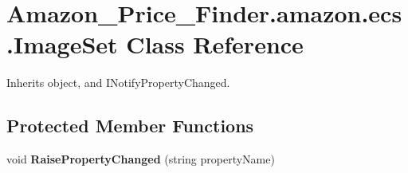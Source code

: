 \hypertarget{class_amazon___price___finder_1_1amazon_1_1ecs_1_1_image_set}{\section{Amazon\-\_\-\-Price\-\_\-\-Finder.\-amazon.\-ecs.\-Image\-Set Class Reference}
\label{class_amazon___price___finder_1_1amazon_1_1ecs_1_1_image_set}
}


 




Inherits object, and I\-Notify\-Property\-Changed.

\subsection*{Protected Member Functions}
\begin{DoxyCompactItemize}
\item 
\hypertarget{class_amazon___price___finder_1_1amazon_1_1ecs_1_1_image_set_a5cc68370e55700594bbea461c3d9d69b}{void {\bfseries Raise\-Property\-Changed} (string property\-Name)}\label{class_amazon___price___finder_1_1amazon_1_1ecs_1_1_image_set_a5cc68370e55700594bbea461c3d9d69b}

\end{DoxyCompactItemize}

